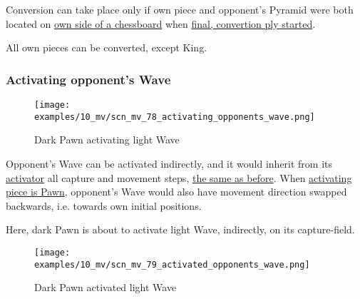 Conversion can take place only if own piece and opponent's Pyramid were both located
on \hyperref[sec:Definitions/Chessboard sides, navigation]{own side of a chessboard}
when
\hyperref[fig:scn_mv_59_converting_opponents_piece_init]{final, convertion ply started}.

All own pieces can be converted, except King.

\clearpage %

\subsubsection*{Activating opponent's Wave}
\label{sec:Miranda's veil/Wave/Movement/Activating opponent's Wave}

\vspace*{-1.5\baselineskip}
\noindent
\begin{figure}[!h]
\texttt{[image: examples/10\_mv/scn\_mv\_78\_activating\_opponents\_wave.png]}
\vspace*{-1.4\baselineskip}
\caption{Dark Pawn activating light Wave}
\label{fig:scn_mv_78_activating_opponents_wave}
\end{figure}

\vspace*{-0.5\baselineskip}
Opponent's Wave can be activated indirectly, and it would inherit from its
\hyperref[sec:Terms/Activator]{activator} all capture and movement steps,
\hyperref[fig:scn_mv_02_wave_activated]{the same as before}. When
\hyperref[fig:scn_mv_23_wave_activation_by_capture_pawn]{activating piece is Pawn},
opponent's Wave would also have movement direction swapped backwards, i.e. towards
own initial positions.

Here, dark Pawn is about to activate light Wave, indirectly, on its capture-field.

\clearpage %

\vspace*{-2.1\baselineskip}
\noindent
\begin{figure}[!h]
\texttt{[image: examples/10\_mv/scn\_mv\_79\_activated\_opponents\_wave.png]}
\vspace*{-1.4\baselineskip}
\caption{Dark Pawn activated light Wave}
\label{fig:scn_mv_79_activated_opponents_wave}
\end{figure}

